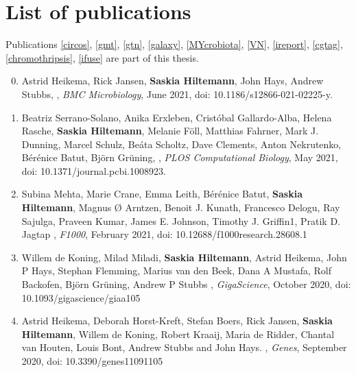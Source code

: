 \chapter{List of publications}
\label{AppendixD}

Publications \ref{circos}, \ref{gmt}, \ref{gtn}, \ref{galaxy}, \ref{MYcrobiota}, \ref{VN}, \ref{ireport}, \ref{cgtag}, \ref{chromothripsis}, \ref{ifuse} are part of this thesis.

\begin{enumerate}
\setcounter{enumi}{-1}

\item Astrid Heikema, Rick Jansen, \textbf{Saskia Hiltemann}, John Hays, Andrew Stubbs, {\color{chaptergrey}{WeFaceNano: a user-friendly pipeline for complete ONT sequence assembly and detection of antibiotic resistance in multi-plasmid bacterial isolates}}, \textit{BMC Microbiology}, June 2021, doi: 10.1186/s12866-021-02225-y.

\item  Beatriz Serrano-Solano, Anika Erxleben, Cristóbal Gallardo-Alba, Helena Rasche, \textbf{Saskia Hiltemann}, Melanie Föll, Matthias Fahrner, Mark J. Dunning, Marcel Schulz, Beáta Scholtz, Dave Clements, Anton Nekrutenko, Bérénice Batut, Björn Grüning, {\color{chaptergrey}{Fostering Accessible Online Education Using Galaxy as an e-learning Platform}}, \textit{PLOS Computational Biology}, May 2021, doi: 10.1371/journal.pcbi.1008923.

\item Subina Mehta, Marie Crane, Emma Leith, Bérénice Batut, \textbf{Saskia Hiltemann}, Magnus Ø Arntzen, Benoit J. Kunath, Francesco Delogu, Ray Sajulga, Praveen Kumar, James E. Johnson, Timothy J. Griffin1, Pratik D. Jagtap {\color{chaptergrey}{ASaiM-MT: a validated and optimized ASaiM workflow for metatranscriptomics analysis within Galaxy framework}}, \textit{F1000}, February 2021, doi: 10.12688/f1000research.28608.1

\item  Willem de Koning, Milad Miladi, \textbf{Saskia Hiltemann}, Astrid Heikema, John P Hays, Stephan Flemming, Marius van den Beek, Dana A Mustafa, Rolf Backofen, Björn Grüning, Andrew P Stubbs {\color{chaptergrey}{NanoGalaxy: Nanopore long-read sequencing data analysis in Galaxy}}, \textit{GigaScience}, October 2020, doi: 10.1093/gigascience/giaa105 \label{one}

\item Astrid Heikema, Deborah Horst-Kreft, Stefan Boers, Rick Jansen, \textbf{Saskia Hiltemann}, Willem de Koning, Robert Kraaij, Maria de Ridder, Chantal van Houten, Louis Bont, Andrew  Stubbs and John Hays. {\color{chaptergrey}{Comparison of Illumina versus Nanopore 16S rRNAGene Sequencing of the Human Nasal Microbiota}}, \textit{Genes}, September 2020, doi: 10.3390/genes11091105


\end{enumerate}
